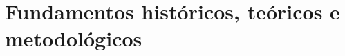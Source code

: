 \documentclass[
	11pt,				%
	openright,			%
	oneside,			%
	a4paper,			%
	english,			%
	french,				%
	spanish,			%
	brazil,				%
	]{abntex2}
\begin{document}
\chapter{Fundamentos históricos, teóricos e metodológicos}
\label{Literatura}

%
%
%
%



% 

%


\postextual




%
%




\end{document}
